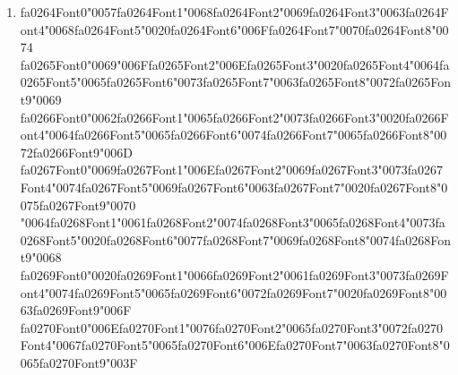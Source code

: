 \documentclass[12pt]{article}
\begin{document}
\begin{enumerate}[label=Q\arabic*.]
 \item {\csname fa0264Font0\endcsname\char"0057}{\csname fa0264Font1\endcsname\char"0068}{\csname fa0264Font2\endcsname\char"0069}{\csname fa0264Font3\endcsname\char"0063}{\csname fa0264Font4\endcsname\char"0068}{\csname fa0264Font5\endcsname\char"0020}{\csname fa0264Font6\endcsname\char"006F}{\csname fa0264Font7\endcsname\char"0070}{\csname fa0264Font8\endcsname\char"0074} {\csname fa0265Font0\endcsname\char"0069}{\char"006F}{\csname fa0265Font2\endcsname\char"006E}{\csname fa0265Font3\endcsname\char"0020}{\csname fa0265Font4\endcsname\char"0064}{\csname fa0265Font5\endcsname\char"0065}{\csname fa0265Font6\endcsname\char"0073}{\csname fa0265Font7\endcsname\char"0063}{\csname fa0265Font8\endcsname\char"0072}{\csname fa0265Font9\endcsname\char"0069} {\csname fa0266Font0\endcsname\char"0062}{\csname fa0266Font1\endcsname\char"0065}{\csname fa0266Font2\endcsname\char"0073}{\csname fa0266Font3\endcsname\char"0020}{\csname fa0266Font4\endcsname\char"0064}{\csname fa0266Font5\endcsname\char"0065}{\csname fa0266Font6\endcsname\char"0074}{\csname fa0266Font7\endcsname\char"0065}{\csname fa0266Font8\endcsname\char"0072}{\csname fa0266Font9\endcsname\char"006D} {\csname fa0267Font0\endcsname\char"0069}{\csname fa0267Font1\endcsname\char"006E}{\csname fa0267Font2\endcsname\char"0069}{\csname fa0267Font3\endcsname\char"0073}{\csname fa0267Font4\endcsname\char"0074}{\csname fa0267Font5\endcsname\char"0069}{\csname fa0267Font6\endcsname\char"0063}{\csname fa0267Font7\endcsname\char"0020}{\csname fa0267Font8\endcsname\char"0075}{\csname fa0267Font9\endcsname\char"0070} {\char"0064}{\csname fa0268Font1\endcsname\char"0061}{\csname fa0268Font2\endcsname\char"0074}{\csname fa0268Font3\endcsname\char"0065}{\csname fa0268Font4\endcsname\char"0073}{\csname fa0268Font5\endcsname\char"0020}{\csname fa0268Font6\endcsname\char"0077}{\csname fa0268Font7\endcsname\char"0069}{\csname fa0268Font8\endcsname\char"0074}{\csname fa0268Font9\endcsname\char"0068} {\csname fa0269Font0\endcsname\char"0020}{\csname fa0269Font1\endcsname\char"0066}{\csname fa0269Font2\endcsname\char"0061}{\csname fa0269Font3\endcsname\char"0073}{\csname fa0269Font4\endcsname\char"0074}{\csname fa0269Font5\endcsname\char"0065}{\csname fa0269Font6\endcsname\char"0072}{\csname fa0269Font7\endcsname\char"0020}{\csname fa0269Font8\endcsname\char"0063}{\csname fa0269Font9\endcsname\char"006F} {\csname fa0270Font0\endcsname\char"006E}{\csname fa0270Font1\endcsname\char"0076}{\csname fa0270Font2\endcsname\char"0065}{\csname fa0270Font3\endcsname\char"0072}{\csname fa0270Font4\endcsname\char"0067}{\csname fa0270Font5\endcsname\char"0065}{\csname fa0270Font6\endcsname\char"006E}{\csname fa0270Font7\endcsname\char"0063}{\csname fa0270Font8\endcsname\char"0065}{\csname fa0270Font9\endcsname\char"003F}

\end{enumerate}
\end{document}
